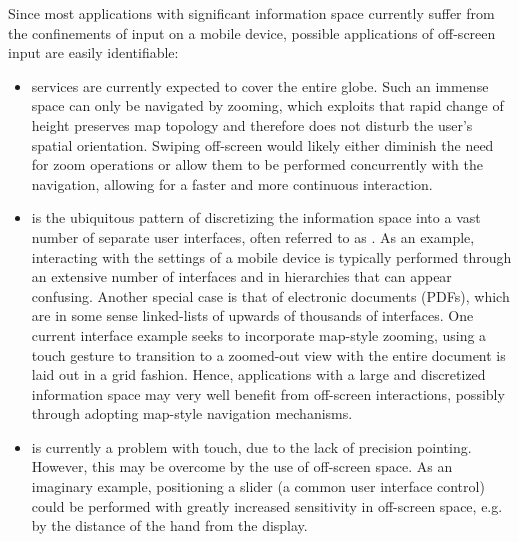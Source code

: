 Since most applications with significant information space currently suffer from the confinements of input on a mobile device, possible applications of off-screen input are easily identifiable: 
\begin{itemize}
	\item {} services are currently expected to cover the entire globe. Such an immense space can only be navigated by zooming, which exploits that rapid change of height preserves map topology and therefore does not disturb the user's spatial orientation. Swiping off-screen would likely either diminish the need for zoom operations or allow them to be performed concurrently with the navigation, allowing for a faster and more continuous interaction.
	\item {} is the ubiquitous pattern of discretizing the information space into a vast number of separate user interfaces, often referred to as . As an example, interacting with the settings of a mobile device is typically performed through an extensive number of interfaces and in hierarchies that can appear confusing. Another special  case is that of electronic documents (PDFs), which are in some sense linked-lists of upwards of thousands of interfaces. One current interface example seeks to incorporate  map-style zooming, using a touch gesture to transition to a zoomed-out view with the entire document is laid out in a grid fashion. Hence, applications with a large and discretized information space may very well benefit from off-screen interactions, possibly through adopting map-style navigation mechanisms.
	\item {} is currently a problem with touch, due to the lack of precision pointing. However, this may be overcome by the use of  off-screen space. As an imaginary example, positioning a slider (a common user interface control) could be performed with greatly increased sensitivity in off-screen space, e.g. by the distance of the hand from the display.
\end{itemize}


